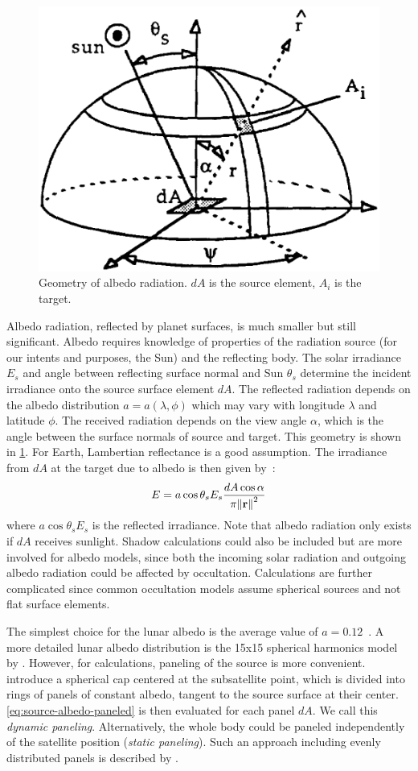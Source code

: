 \documentclass[parskip=full,DIV=15]{scrartcl}
\begin{document}
\begin{figure}[ht]
   \centering
   \includegraphics[width=.3\linewidth]{figures/earth_panel_irradiance.png}
   \caption{Geometry of albedo radiation. $dA$ is the source element, $A_i$ is the target.}
   \label{fig:albedo-geometry}
\end{figure}

Albedo radiation, reflected by planet surfaces, is much smaller but still significant. Albedo requires knowledge of properties of the radiation source (for our intents and purposes, the Sun) and the reflecting body. The solar irradiance $E_s$ and angle between reflecting surface normal and Sun $\theta_s$ determine the incident irradiance onto the source surface element $dA$. The reflected radiation depends on the albedo distribution $a=a(\lambda, \phi)$ which may vary with longitude $\lambda$ and latitude $\phi$. The received radiation depends on the view angle $\alpha$, which is the angle between the surface normals of source and target. This geometry is shown in \cref{fig:albedo-geometry}. For Earth, Lambertian reflectance is a good assumption. The irradiance from $dA$ at the target due to albedo is then given by~\cite{Knocke1988}:
\begin{align}\label{eq:source-albedo-paneled}
   E = a\cos\theta_s E_s\frac{dA\cos\alpha}{\pi \norm{\vb r}^2}
\end{align}
where $a\cos\theta_s E_s$ is the reflected irradiance. Note that albedo radiation only exists if $dA$ receives sunlight. Shadow calculations could also be included but are more involved for albedo models, since both the incoming solar radiation and outgoing albedo radiation could be affected by occultation. Calculations are further complicated since common occultation models assume spherical sources and not flat surface elements.

The simplest choice for the lunar albedo is the average value of $a=0.12$~\cite{Mueller2021}. A more detailed lunar albedo distribution is the 15x15 spherical harmonics model by \textcite{Floberghagen1999}. However, for calculations, paneling of the source is more convenient. \textcite{Knocke1988} introduce a spherical cap centered at the subsatellite point, which is divided into rings of panels of constant albedo, tangent to the source surface at their center. \cref{eq:source-albedo-paneled} is then evaluated for each panel $dA$. We call this \emph{dynamic paneling}. Alternatively, the whole body could be paneled independently of the satellite position (\emph{static paneling}). Such an approach including evenly distributed panels is described by \textcite{Wetterer2014}.
\end{document}
